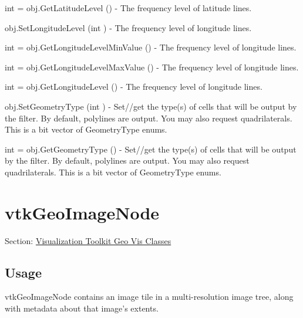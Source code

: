 \begin{DoxyItemize}
\item {\ttfamily int = obj.\-Get\-Latitude\-Level ()} -\/ The frequency level of latitude lines.  
\item {\ttfamily obj.\-Set\-Longitude\-Level (int )} -\/ The frequency level of longitude lines.  
\item {\ttfamily int = obj.\-Get\-Longitude\-Level\-Min\-Value ()} -\/ The frequency level of longitude lines.  
\item {\ttfamily int = obj.\-Get\-Longitude\-Level\-Max\-Value ()} -\/ The frequency level of longitude lines.  
\item {\ttfamily int = obj.\-Get\-Longitude\-Level ()} -\/ The frequency level of longitude lines.  
\item {\ttfamily obj.\-Set\-Geometry\-Type (int )} -\/ Set//get the type(s) of cells that will be output by the filter. By default, polylines are output. You may also request quadrilaterals. This is a bit vector of Geometry\-Type enums.  
\item {\ttfamily int = obj.\-Get\-Geometry\-Type ()} -\/ Set//get the type(s) of cells that will be output by the filter. By default, polylines are output. You may also request quadrilaterals. This is a bit vector of Geometry\-Type enums.  
\end{DoxyItemize}\hypertarget{vtkgeovis_vtkgeoimagenode}{}\section{vtk\-Geo\-Image\-Node}\label{vtkgeovis_vtkgeoimagenode}
Section\-: \hyperlink{sec_vtkgeovis}{Visualization Toolkit Geo Vis Classes} \hypertarget{vtkwidgets_vtkxyplotwidget_Usage}{}\subsection{Usage}\label{vtkwidgets_vtkxyplotwidget_Usage}
vtk\-Geo\-Image\-Node contains an image tile in a multi-\/resolution image tree, along with metadata about that image's extents.

